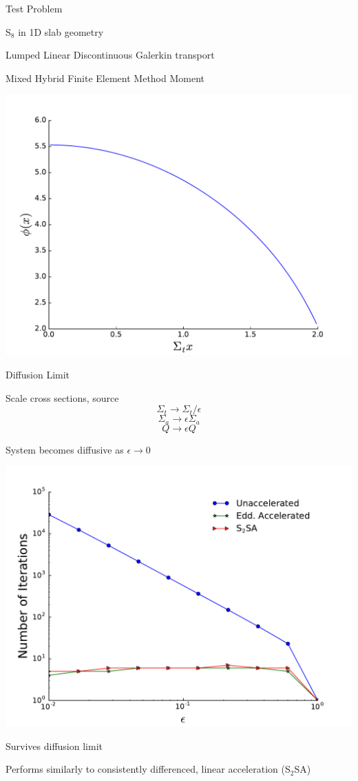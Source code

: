 \documentclass[10pt]{beamer}
\begin{document}

\begin{frame}{Test Problem}

	S$_8$ in 1D slab geometry 

	Lumped Linear Discontinuous Galerkin transport 

	Mixed Hybrid Finite Element Method Moment 

	\vfill
	\centerline{\includegraphics[width=.5\paperwidth]{figs/exSol.pdf}}

\end{frame}

\begin{frame}{Diffusion Limit}

	\footnotesize
	Scale cross sections, source 
	$$\Sigma_t \rightarrow \Sigma_t/\epsilon $$
	$$\Sigma_a \rightarrow \epsilon \Sigma_a$$
	$$Q \rightarrow \epsilon Q$$ 

	System becomes diffusive as $\epsilon \rightarrow 0$ 

	\pause
	\centerline{\includegraphics[width=.5\paperwidth]{figs/diffLimit.pdf}}

	\pause
	Survives diffusion limit 

	\pause
	Performs similarly to consistently differenced, linear acceleration (S$_2$SA)

\end{frame}
\end{document}
